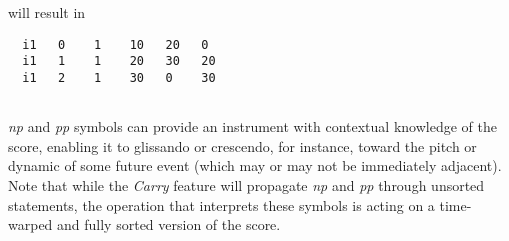  
 will result in 

 
\begin{lstlisting}
  i1   0    1    10   20   0 
  i1   1    1    20   30   20 
  i1   2    1    30   0    30
     
\end{lstlisting}


 


 \emph{np}
 and \emph{pp}
 symbols can provide an instrument with contextual knowledge of the score, enabling it to glissando or crescendo, for instance, toward the pitch or dynamic of some future event (which may or may not be immediately adjacent). Note that while the \emph{Carry}
 feature will propagate \emph{np}
 and \emph{pp}
 through unsorted statements, the operation that interprets these symbols is acting on a time-warped and fully sorted version of the score. 


\begin{comment}
\begin{tabular}{lcr}
Previous &Home &Next \\
The Standard Numeric Score &Up &Ramping

\end{tabular}



\end{comment}
